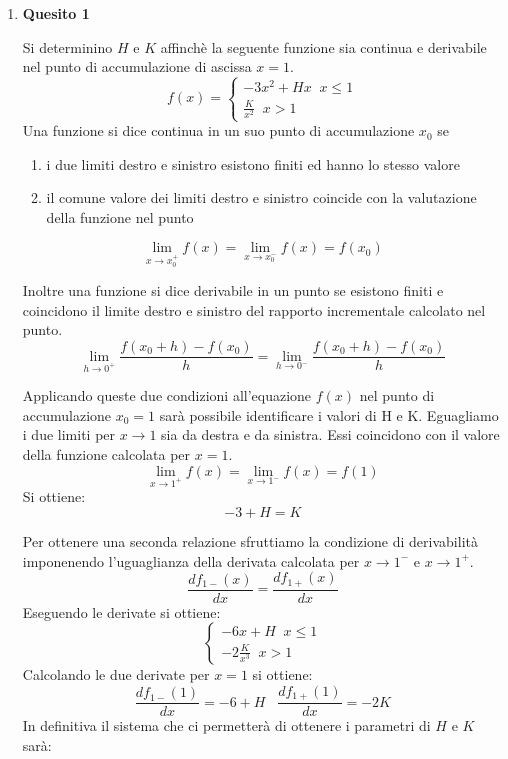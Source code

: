 \documentclass[a4paper,12pt]{article}
\begin{document}
\begin{enumerate}
\item \textbf{Quesito 1}

Si determinino $H$ e $K$ affinchè la seguente funzione sia continua e derivabile nel punto di accumulazione di ascissa $x=1$.
\begin{equation} f(x)=
\left\{
\begin{array}{l}
 -3x^2+Hx\;\; x \le 1\\ \frac{K}{x^2}\;\; x>1
\end{array}
\right.
\end{equation}
Una funzione si dice continua in un suo punto di accumulazione $x_0$ se 
\begin{enumerate}
\item i due limiti destro e sinistro esistono finiti ed hanno lo stesso valore
\item il comune valore dei limiti destro e sinistro coincide con la valutazione della funzione nel punto
\end{enumerate}
\begin{equation}\lim_{x\rightarrow x_0^{+}} f(x) = \lim_{x\rightarrow x_0^{-}} f(x) = f(x_0)\end{equation}

Inoltre una funzione si dice derivabile in un punto se esistono finiti e coincidono il limite destro e sinistro del rapporto incrementale calcolato nel punto.
\begin{equation}\lim_{h\rightarrow 0^{+}} \frac{f(x_0+h) - f(x_0)}{h} = \lim_{h\rightarrow 0^{-}} \frac{f(x_0+h) - f(x_0)}{h}\end{equation}

Applicando queste due condizioni all'equazione $f(x)$ nel punto di accumulazione $x_0=1$ sarà possibile identificare i valori di H e K.
Eguagliamo i due limiti per $x \rightarrow 1$ sia da destra e da sinistra. Essi coincidono con il valore della funzione calcolata per $x=1$.
\begin{equation}\lim_{x\rightarrow 1^{+}} f(x) = \lim_{x\rightarrow 1^{-}} f(x)=f(1)\end{equation}
Si ottiene:
\begin{equation} -3+H=K\end{equation}

Per ottenere una seconda relazione sfruttiamo la condizione di derivabilità imponenendo l'uguaglianza della derivata calcolata per $x\rightarrow1^{-}$ e $x\rightarrow 1^{+}$.
\begin{equation}\frac{df_{1-}(x)}{dx}=\frac{df_{1+}(x)}{dx}\end{equation}
Eseguendo le derivate si ottiene:
\begin{equation}
\left\{
\begin{array}{l}
 -6x+H\;\; x \le 1\\ -2\frac{K}{x^3}\;\; x>1
\end{array}
\right.
\end{equation}
Calcolando le due derivate per $x=1$ si ottiene:
\begin{equation}\frac{df_{1-}(1)}{dx}=-6+H\;\;\;\frac{df_{1+}(1)}{dx}=-2K\end{equation}
In definitiva il sistema che ci permetterà di ottenere i parametri di $H$ e $K$ sarà:


\end{enumerate}
\end{document}

